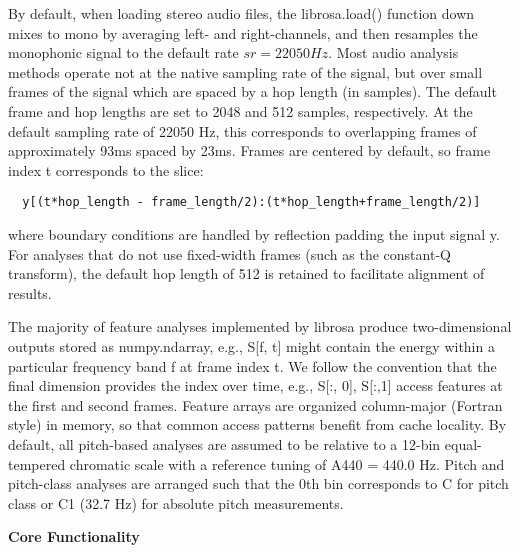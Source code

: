 By default, when loading stereo audio files, the librosa.load() function down mixes to mono by averaging left- and right-channels, and then resamples the monophonic signal to the default rate $ sr=22050Hz $. Most audio analysis methods operate not at the native sampling rate of the signal, but over small frames of the signal which are spaced by a hop length (in samples). The default frame and hop lengths are set to 2048 and 512 samples, respectively. At the default sampling rate of 22050 Hz, this corresponds to overlapping frames of approximately 93ms spaced by 23ms. Frames are centered by default, so frame index t corresponds to the slice:

\begin{lstlisting}
  y[(t*hop_length - frame_length/2):(t*hop_length+frame_length/2)]
\end{lstlisting}

where boundary conditions are handled by reflection padding the input signal y. For analyses that do not use fixed-width frames (such as the constant-Q transform), the default hop length of 512 is retained to facilitate alignment of results.

\par

The majority of feature analyses implemented by librosa produce two-dimensional outputs stored as numpy.ndarray, e.g., S[f, t] might contain the energy within a particular frequency band f at frame index t. We follow the convention that the final dimension provides the index over time, e.g., S[:, 0],  S[:,1] access features at the first and second frames. Feature arrays are organized column-major (Fortran style) in memory, so that common access patterns benefit from cache locality. By default, all pitch-based analyses are assumed to be relative to a 12-bin equal-tempered chromatic scale with a reference tuning of A440 = 440.0 Hz. Pitch and pitch-class analyses are arranged such that the 0th bin corresponds to C for pitch class or C1 (32.7 Hz) for absolute pitch measurements.

\par
\begin{flushleft}
  \textbf{Core Functionality}
\end{flushleft}

